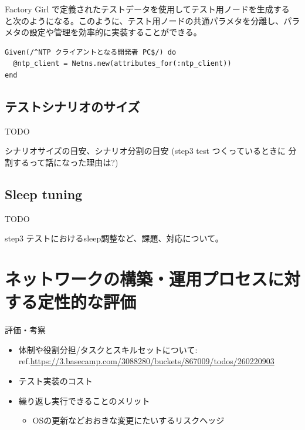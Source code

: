 Factory Girl で定義されたテストデータを使用してテスト用ノードを生成する
と次のようになる。このように、テスト用ノードの共通パラメタを分離し、パラ
メタの設定や管理を効率的に実装することができる。
\begin{lstlisting}
Given(/^NTP クライアントとなる開発者 PC$/) do
  @ntp_client = Netns.new(attributes_for(:ntp_client))
end
\end{lstlisting}

  \subsection{テストシナリオのサイズ}

TODO

シナリオサイズの目安、シナリオ分割の目安 (step3 test つくっているときに
分割するって話になった理由は?)


  \subsection{Sleep tuning}

TODO

step3 テストにおけるsleep調整など、課題、対応について。


\section{ネットワークの構築・運用プロセスに対する定性的な評価}
評価・考察
\begin{itemize}
 \item 体制や役割分担/タスクとスキルセットについて: ref.\url{https://3.basecamp.com/3088280/buckets/867009/todos/260220903}
 \item テスト実装のコスト
 \item 繰り返し実行できることのメリット
       \begin{itemize}
        \item OSの更新などおおきな変更にたいするリスクヘッジ
       \end{itemize}
\end{itemize}


